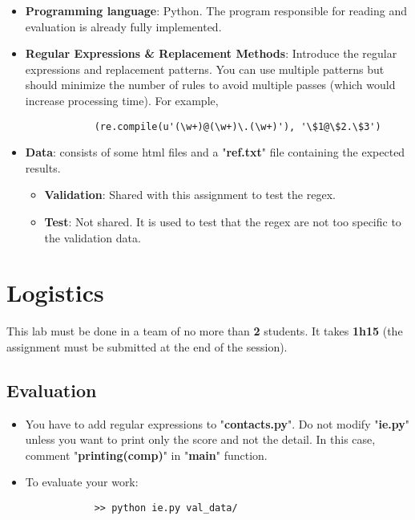 \documentclass{../../../extra/aakpract/aakpract}
\begin{document}
\begin{itemize}
	\item \textbf{Programming language}: Python.
	The program responsible for reading and evaluation is already fully implemented.
	\item \textbf{Regular Expressions \& Replacement Methods}: 
	Introduce the regular expressions and replacement patterns.
	You can use multiple patterns but should minimize the number of rules to avoid multiple passes (which would increase processing time). 
	For example, 
	\begin{small}
		\begin{verbatim}
			(re.compile(u'(\w+)@(\w+)\.(\w+)'), '\$1@\$2.\$3')
		\end{verbatim}
	\end{small}\vspace{-0.5cm}
	\item \textbf{Data}: consists of some html files and a "\textbf{ref.txt}" file containing the expected results.
	\begin{itemize}
		\item \textbf{Validation}: Shared with this assignment to test the regex.
		\item \textbf{Test}: Not shared. It is used to test that the regex are not too specific to the validation data.
	\end{itemize}
\end{itemize}

\section{Logistics}

This lab must be done in a team of no more than \textbf{2} students.
It takes \textbf{1h15} (the assignment must be submitted at the end of the session).

\subsection{Evaluation}

\begin{itemize}
	\item You have to add regular expressions to "\textbf{contacts.py}". 
	Do not modify "\textbf{ie.py}" unless you want to print only the score and not the detail. In this case, comment "\textbf{printing(comp)}" in "\textbf{main}" function.
	\item To evaluate your work:
	\begin{small}
		\begin{verbatim}
			>> python ie.py val_data/
		\end{verbatim}
	\end{small}\vspace{-1cm}
\end{itemize}
\end{document}
